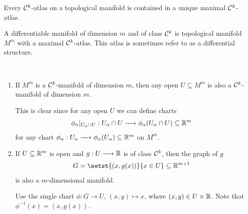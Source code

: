 \begin{lemma}
	Every $\mathcal{C}^k$-atlas on a topological manifold is contained in a unique maximal $\mathcal{C}^k$-atlas.
\end{lemma}

\begin{definition}
	A differentiable manifold of dimension $m$ and of class $\mathcal{C}^k$ is topological manifold $M^m$ with a maximal $\mathcal{C}^k$-atlas. This atlas is sometimes refer to as a differential structure.
\end{definition}

\begin{example}
	~
	\begin{enumerate}[(1)]
		\item
		If $M^m$ is a $\mathcal{C}^k$-manifold of dimension $m$, then any open $U\subseteq M^m$ is also a $\mathcal{C}^k$-manifold of dimension $m$.

		This is clear since for any open $U$ we can define charts
		$$\phi_\alpha\rvert_{U_\alpha\cap U} : U_\alpha\cap U \to \phi_\alpha(U_\alpha\cap U) \subseteq \bbR^m$$
		for any chart $\phi_\alpha : U_\alpha \to \phi_\alpha(U_\alpha) \subseteq \bbR^m$ on $M^m$.

		\item 
		If $U\subseteq \mathbb R^m$ is open and $g:U \to \bbR$ is of class $\mathcal{C}^k$, then the graph of $g$
		$$ G = \setst{ (x,g(x)) }{ x \in U} \subseteq \bbR^{m+1} $$
		is also a $m$-dimensional manifold.
		
		Use the single chart $\phi : G \to U$, $(x, y) \mapsto x$, where $(x,y)\in U\times\mathbb R$. Note that $\phi^{-1}(x)=(x,g(x))$.


\end{enumerate}
\end{example}
